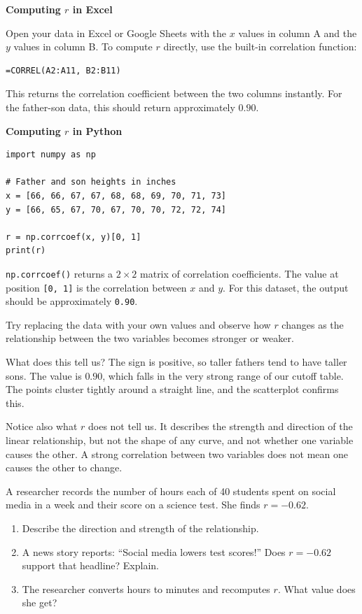 \begin{Worked}
\begin{Solution}
\textbf{Computing $r$ in Excel}

Open your data in Excel or Google Sheets with the $x$ values in
column A and the $y$ values in column B. To compute $r$ directly,
use the built-in correlation function:

\begin{verbatim}
=CORREL(A2:A11, B2:B11)
\end{verbatim}

This returns the correlation coefficient between the two columns
instantly. For the father-son data, this should return approximately
$0.90$.


\textbf{Computing $r$ in Python}

\begin{verbatim}
import numpy as np

# Father and son heights in inches
x = [66, 66, 67, 67, 68, 68, 69, 70, 71, 73]
y = [66, 65, 67, 70, 67, 70, 70, 72, 72, 74]

r = np.corrcoef(x, y)[0, 1]
print(r)
\end{verbatim}

\texttt{np.corrcoef()} returns a $2 \times 2$ matrix of correlation
coefficients. The value at position \texttt{[0, 1]} is the
correlation between $x$ and $y$. For this dataset, the output
should be approximately \texttt{0.90}.

Try replacing the data with your own values and observe how $r$
changes as the relationship between the two variables becomes
stronger or weaker.

What does this tell us? The sign is positive, so taller fathers tend
to have taller sons. The value is $0.90$, which falls in the very
strong range of our cutoff table. The points cluster tightly around
a straight line, and the scatterplot confirms this.
\end{Solution}
\end{Worked}

Notice also what $r$ does not tell us. It describes the strength and
direction of the linear relationship, but not the shape of any
curve, and not whether one variable causes the other. A strong
correlation between two variables does not mean one causes the other
to change.

\begin{Exercise}[title={Interpreting a Computed $r$}, label={ex:workedex}]
A researcher records the number of hours each of 40 students spent on
social media in a week and their score on a science test. She finds
$r = -0.62$.
\begin{enumerate}
\item Describe the direction and strength of the relationship.
\item A news story reports: ``Social media lowers test scores!'' Does
      $r = -0.62$ support that headline? Explain.
\item The researcher converts hours to minutes and recomputes $r$. What
      value does she get?
\end{enumerate}
\end{Exercise}

